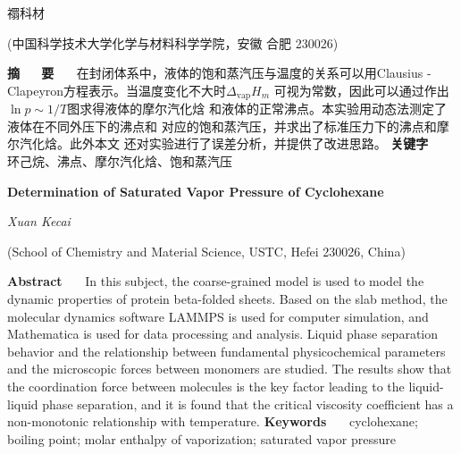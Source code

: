 \documentclass[12pt]{ctexart}
\numberwithin{equation}{section}
\begin{document}
\nocite{*}

\begin{center}
    \heiti {}

    \vspace{12pt}

    \kaishu \fontsize{13.75pt}{0}禤科材
    


    \vspace{5pt}

    \songti \fontsize{12pt}{0}(中国科学技术大学化学与材料科学学院，安徽 合肥 230026)
\end{center}

\noindent\textbf{摘~~~\!要}~~~\!
在封闭体系中，液体的饱和蒸汽压与温度的关系可以用Clausius -
Clapeyron方程表示。当温度变化不大时$\Delta_{\text{vap}} H_m$
可视为常数，因此可以通过作出$\ln p \sim 1/T$图求得液体的摩尔汽化焓
和液体的正常沸点。本实验用动态法测定了液体在不同外压下的沸点和
对应的饱和蒸汽压，并求出了标准压力下的沸点和摩尔汽化焓。此外本文
还对实验进行了误差分析，并提供了改进思路。
\newline
\textbf{关键字}~~~\!
环己烷、沸点、摩尔汽化焓、饱和蒸汽压

\begin{center}
    {\LARGE\rmfamily\textbf{Determination of Saturated Vapor Pressure of Cyclohexane}}

    \vspace{12pt}

    {\slshape Xuan Kecai}

    \vspace{5pt}

    (School of Chemistry and Material Science, USTC, Hefei 230026, China)
\end{center}

\noindent\textbf{Abstract}~~~\!
In this subject, the coarse-grained model is used to model the dynamic properties of protein beta-folded sheets. Based on the slab method, the molecular dynamics software LAMMPS is used for computer simulation, and Mathematica is used for data processing and analysis. Liquid phase separation behavior and the relationship between fundamental physicochemical parameters and the microscopic forces between monomers are studied. The results show that the coordination force between molecules is the key factor leading to the liquid-liquid phase separation, and it is found that the critical viscosity coefficient has a non-monotonic relationship with temperature.
\newline
\textbf{Keywords}~~~\!
cyclohexane; boiling point; molar enthalpy of vaporization;
saturated vapor pressure
\end{document}
